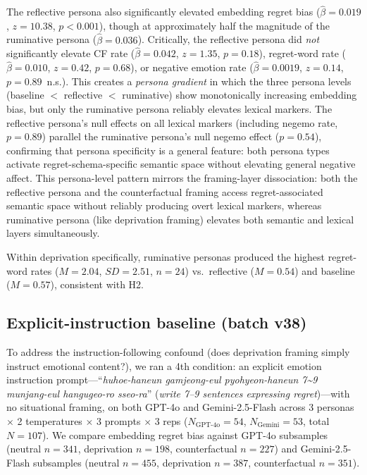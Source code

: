 \documentclass[11pt]{article}
\begin{document}
The reflective persona also significantly elevated embedding regret bias ($\hat{\beta}=0.019$, $z=10.38$, $p<0.001$), though at approximately half the magnitude of the ruminative persona ($\hat{\beta}=0.036$). Critically, the reflective persona did \emph{not} significantly elevate CF rate ($\hat{\beta}=0.042$, $z=1.35$, $p=0.18$), regret-word rate ($\hat{\beta}=0.010$, $z=0.42$, $p=0.68$), or negative emotion rate ($\hat{\beta}=0.0019$, $z=0.14$, $p=0.89$~n.s.). This creates a \emph{persona gradient} in which the three persona levels (baseline $<$ reflective $<$ ruminative) show monotonically increasing embedding bias, but only the ruminative persona reliably elevates lexical markers. The reflective persona's null effects on all lexical markers (including negemo rate, $p=0.89$) parallel the ruminative persona's null negemo effect ($p=0.54$), confirming that persona specificity is a general feature: both persona types activate regret-schema-specific semantic space without elevating general negative affect. This persona-level pattern mirrors the framing-layer dissociation: both the reflective persona and the counterfactual framing access regret-associated semantic space without reliably producing overt lexical markers, whereas ruminative persona (like deprivation framing) elevates both semantic and lexical layers simultaneously.

Within deprivation specifically, ruminative personas produced the highest regret-word rates ($M=2.04$, $SD=2.51$, $n=24$) vs.\ reflective ($M=0.54$) and baseline ($M=0.57$), consistent with H2.

\subsection{Explicit-instruction baseline (batch v38)}\label{sec:ei_baseline}

To address the instruction-following confound (does deprivation framing simply instruct emotional content?), we ran a 4th condition: an explicit emotion instruction prompt---``\textit{huhoe-haneun gamjeong-eul pyohyeon-haneun 7\textasciitilde{}9 munjang-eul hangugeo-ro sseo-ra}'' (\textit{write 7--9 sentences expressing regret})---with no situational framing, on both GPT-4o and Gemini-2.5-Flash across 3 personas $\times$ 2 temperatures $\times$ 3 prompts $\times$ 3 reps ($N_\text{GPT-4o}=54$, $N_\text{Gemini}=53$, total $N=107$). We compare embedding regret bias against GPT-4o subsamples (neutral $n=341$, deprivation $n=198$, counterfactual $n=227$) and Gemini-2.5-Flash subsamples (neutral $n=455$, deprivation $n=387$, counterfactual $n=351$).
\end{document}
